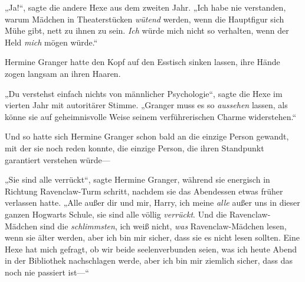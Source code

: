 „Ja!“, sagte die andere Hexe aus dem zweiten Jahr. „Ich habe nie verstanden, warum Mädchen in Theaterstücken \emph{wütend} werden, wenn die Hauptfigur sich Mühe gibt, nett zu ihnen zu sein. \emph{Ich} würde mich nicht so verhalten, wenn der Held \emph{mich} mögen würde.“

Hermine Granger hatte den Kopf auf den Esstisch sinken lassen, ihre Hände zogen langsam an ihren Haaren.

„Du verstehst einfach nichts von männlicher Psychologie“, sagte die Hexe im vierten Jahr mit autoritärer Stimme. „Granger muss es so \emph{aussehen} lassen, als könne sie auf geheimnisvolle Weise seinem verführerischen Charme widerstehen.“


Und so hatte sich Hermine Granger schon bald an die einzige Person gewandt, mit der sie noch reden konnte, die einzige Person, die ihren Standpunkt garantiert verstehen würde—

„Sie sind alle verrückt“, sagte Hermine Granger, während sie energisch in Richtung Ravenclaw-Turm schritt, nachdem sie das Abendessen etwas früher verlassen hatte. „Alle außer dir und mir, Harry, ich meine \emph{alle} außer uns in dieser ganzen Hogwarts Schule, sie sind alle völlig \emph{verrückt}. Und die Ravenclaw-Mädchen sind die \emph{schlimmsten}, ich weiß nicht, \emph{was} Ravenclaw-Mädchen lesen, wenn sie älter werden, aber ich bin mir sicher, dass sie es nicht lesen sollten. Eine Hexe hat mich gefragt, ob wir beide seelenverbunden seien, was ich heute Abend in der Bibliothek nachschlagen werde, aber ich bin mir ziemlich sicher, dass das noch nie passiert ist—“


